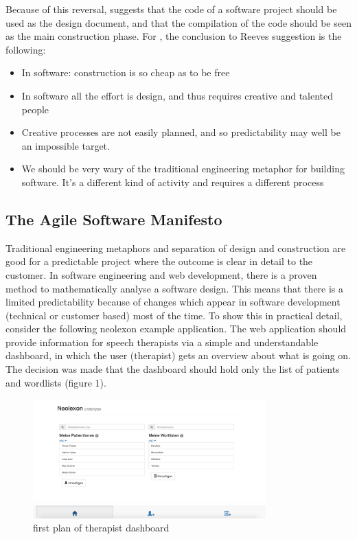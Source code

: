 Because of this reversal, \cite{reeves1992software} suggests that the code of a software project should be used as the design document, and that the compilation of the
code should be seen as the main construction phase. For \cite{fowler2001new}, the conclusion to Reeves suggestion is the following:
\begin{itemize}
  \item In software: construction is so cheap as to be free
  \item In software all the effort is design, and thus requires creative and talented people
  \item Creative processes are not easily planned, and so predictability may well be an impossible target.
  \item We should be very wary of the traditional engineering metaphor for building software. It's a different kind of activity and requires a different process
\end{itemize} \cite{fowler2001new}

\newpage

\subsection{The Agile Software Manifesto}
Traditional engineering metaphors and separation of design and construction are good for a predictable project where the outcome is clear in
detail to the customer. In software engineering and web development, there is a proven method to mathematically analyse a software design. This means that there is a limited predictability because of changes which appear in software development (technical or customer based) most of the time. To show this in practical detail, consider the following neolexon example application. The web application should provide information for speech therapists via a simple and understandable dashboard, in which the user (therapist) gets an overview about what is going on. The decision was made that the dashboard should hold only the list of patients and wordlists (figure 1).

\begin{figure}[h!]
  \centering
  \includegraphics[width=0.8\textwidth]{images/patientsandlists.png}
  \caption{first plan of therapist dashboard}
\end{figure}


